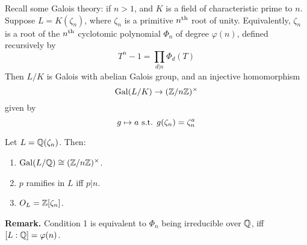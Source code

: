 \documentclass[10pt,a4paper]{article}
\begin{document}
Recall some Galois theory: if $n > 1$, and $K$ is a field of characteristic prime to $n$. Suppose $L = K(\zeta_n)$, where $\zeta_n$ is a primitive $n\textsuperscript{th}$ root of unity. Equivalently, $\zeta_n$ is a root of the $n\textsuperscript{th}$ cyclotomic polynomial $\Phi_n$ of degree $\varphi(n)$, defined recursively by
\[T^n-1 = \prod_{d|n}\Phi_d(T)\]
Then $L/K$ is Galois with abelian Galois group, and an injective homomorphism
\[\operatorname{Gal}(L/K) \to (\mathbb{Z}/n\mathbb{Z})^\times\]
given by
\[g\mapsto a \text{ s.t. } g(\zeta_n) = \zeta_n^a\]
\begin{theorem}
  Let $L = \mathbb{Q}(\zeta_n)$. Then:
  \begin{enumerate}
    \item $\operatorname{Gal}(L/\mathbb{Q}) \cong (\mathbb{Z}/n\mathbb{Z})^\times$.
    \item $p$ ramifies in $L$ iff $p|n$.
    \item $O_L = \mathbb{Z}[\zeta_n]$.
  \end{enumerate}
\end{theorem}
\textbf{Remark.} Condition 1 is equivalent to $\Phi_n$ being irreducible over $\mathbb{Q}$, iff $[L:\mathbb{Q}] = \varphi(n)$.
\end{document}

